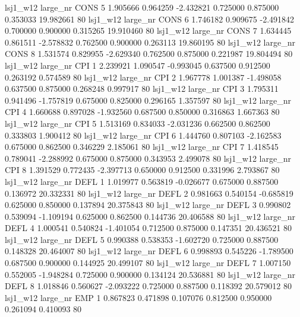     lsj1_w12   large_nr     CONS                 5  1.905666  0.964259  -2.432821 0.725000 0.875000  0.353033   19.982661 80
    lsj1_w12   large_nr     CONS                 6  1.746182  0.909675  -2.491842 0.700000 0.900000  0.315265   19.910460 80
    lsj1_w12   large_nr     CONS                 7  1.634445  0.861511  -2.578832 0.762500 0.900000  0.263113   19.860195 80
    lsj1_w12   large_nr     CONS                 8  1.531574  0.829955  -2.629340 0.762500 0.875000  0.221987   19.804494 80
    lsj1_w12   large_nr      CPI                 1  2.239921  1.090547  -0.993045 0.637500 0.912500  0.263192    0.574589 80
    lsj1_w12   large_nr      CPI                 2  1.967778  1.001387  -1.498058 0.637500 0.875000  0.268248    0.997917 80
    lsj1_w12   large_nr      CPI                 3  1.795311  0.941496  -1.757819 0.675000 0.825000  0.296165    1.357597 80
    lsj1_w12   large_nr      CPI                 4  1.660688  0.897028  -1.932560 0.687500 0.850000  0.316863    1.667363 80
    lsj1_w12   large_nr      CPI                 5  1.513169  0.834033  -2.031236 0.662500 0.862500  0.333803    1.900412 80
    lsj1_w12   large_nr      CPI                 6  1.444760  0.807103  -2.162583 0.675000 0.862500  0.346229    2.185061 80
    lsj1_w12   large_nr      CPI                 7  1.418545  0.789041  -2.288992 0.675000 0.875000  0.343953    2.499078 80
    lsj1_w12   large_nr      CPI                 8  1.391529  0.772435  -2.397713 0.650000 0.912500  0.331996    2.793867 80
    lsj1_w12   large_nr     DEFL                 1  1.019977  0.563819  -0.026677 0.675000 0.887500  0.136972   20.332331 80
    lsj1_w12   large_nr     DEFL                 2  0.981663  0.540154  -0.685819 0.625000 0.850000  0.137894   20.375843 80
    lsj1_w12   large_nr     DEFL                 3  0.990802  0.539094  -1.109194 0.625000 0.862500  0.144736   20.406588 80
    lsj1_w12   large_nr     DEFL                 4  1.000541  0.540824  -1.401054 0.712500 0.875000  0.147351   20.436521 80
    lsj1_w12   large_nr     DEFL                 5  0.990388  0.538353  -1.602720 0.725000 0.887500  0.148328   20.464007 80
    lsj1_w12   large_nr     DEFL                 6  0.998893  0.545226  -1.789500 0.687500 0.900000  0.144925   20.499107 80
    lsj1_w12   large_nr     DEFL                 7  1.007150  0.552005  -1.948284 0.725000 0.900000  0.134124   20.536881 80
    lsj1_w12   large_nr     DEFL                 8  1.018846  0.560627  -2.093222 0.725000 0.887500  0.118392   20.579012 80
    lsj1_w12   large_nr      EMP                 1  0.867823  0.471898   0.107076 0.812500 0.950000  0.261094    0.410093 80
